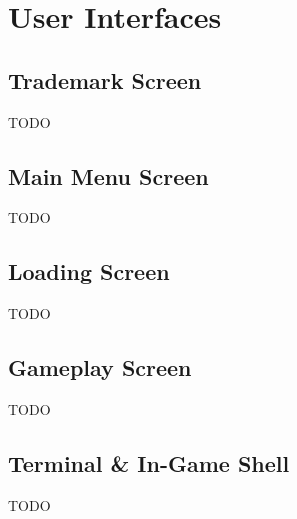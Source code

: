 \section{User Interfaces} \label{sec:user_interfaces}


\subsection{Trademark Screen}
TODO

\subsection{Main Menu Screen}
TODO

\subsection{Loading Screen}
TODO

\subsection{Gameplay Screen}
TODO

\subsection{Terminal \& In-Game Shell}
TODO

